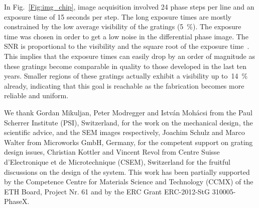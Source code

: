 \documentclass{pnastwo}
\begin{document}
\begin{article}
\begin{materials}
In Fig.~\ref{Fig:img_chip}, image acquisition involved 24 phase steps per
line and an exposure time of 15 seconds per step. The long
exposure times are mostly constrained by the low average visibility of the
gratings (\SI{5}{\percent}). The exposure time was chosen in order to
get a low noise in the differential phase image. The SNR is
proportional to the visibility and the square root of the exposure
time~\cite{Raupach2011}.
This implies that the exposure times can easily drop by an order of
magnitude as these gratings become comparable in quality to those developed
in the last ten years. 
Smaller regions of these gratings actually exhibit a visibility up
to~\SI{14}{\percent} already, indicating that this goal is reachable as the
fabrication becomes more reliable and uniform.
\end{materials}



\begin{acknowledgments}
We thank Gordan Mikuljan, Peter Modregger and István Mohácsi from the Paul
Scherrer Institute (PSI), Switzerland, for the
work on the mechanical design, the scientific advice, and the SEM images
respectively, Joachim Schulz and Marco Walter from
Microworks GmbH, Germany, for the competent support on grating design
issues, Christian Kottler and Vincent Revol from Centre Suisse
d'Electronique et de Microtechnique (CSEM), Switzerland for the fruitful
discussions on the design of the system. This work has been partially
supported by the Competence Centre for Materials Science and Technology
(CCMX) of the ETH Board, Project Nr. 61 and by the ERC Grant ERC-2012-StG 310005-PhaseX.
\end{acknowledgments}





\end{article}
\end{document}
